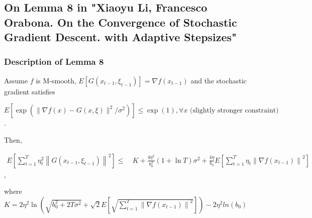 \documentclass[14pt,onecolumn,letterpaper]{extarticle}
\begin{document}
\subsection{On Lemma 8 in "Xiaoyu Li, Francesco Orabona. On the Convergence of Stochastic Gradient Descent. with Adaptive Stepsizes"}
\subsubsection{Description of Lemma 8}
Assume $f$ is M-smooth, $E[G(x_{t-1},\xi_{t-1})]=\nabla f(x_{t-1})$ and the stochastic gradient satisfies \par\vspace{3mm}$E\left[\exp \left(\|\nabla f(x)-G(x, \xi)\|^2 / \sigma^2\right)\right] \leq \exp (1), \forall x\text{ (slightly stronger constraint)}$. \par\vspace{3mm} Then, \par\vspace{3mm}
$\begin{aligned} E\left[\sum_{t=1}^T \eta_t^2\left\|G\left(x_{t-1}, \xi_{t-1}\right)\right\|^2\right] \leq &\ K+\frac{4 \eta^2}{b_0^2}(1+\ln T) \sigma^2 +\frac{4 \eta}{b_0} E\left[\sum_{t=1}^T \eta_t\left\|\nabla f\left(x_{t-1}\right)\right\|^2\right]
\end{aligned}$, \par\vspace{4mm} where 
$K=2 \eta^2 \ln \left(\sqrt{b_0^2+2 T \sigma^2}+\sqrt{2} E\left[\sqrt{\sum_{t=1}^T\left\|\nabla f\left(x_{t-1}\right)\right\|^2}\right]\right)-2\eta^2 ln(b_0)$
\end{document}
